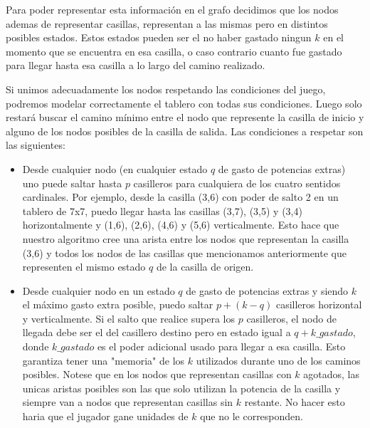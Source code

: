 Para poder representar esta informaci\'on en el grafo decidimos que los nodos ademas de representar casillas, representan a las mismas pero en distintos posibles estados. Estos estados pueden ser el no haber gastado ningun $k$ en el momento que se encuentra en esa casilla, o caso contrario cuanto fue gastado para llegar hasta esa casilla a lo largo del camino realizado.


Si unimos adecuadamente los nodos respetando las condiciones del juego, podremos modelar correctamente el tablero con todas sus condiciones. Luego solo restar\'a buscar el camino m\'inimo entre el nodo que represente la casilla de inicio y alguno de los nodos posibles de la casilla de salida. Las condiciones a respetar son las siguientes:

\begin{itemize}
\item Desde cualquier nodo (en cualquier estado $q$ de gasto de potencias extras) uno puede saltar hasta $p$ casilleros para cualquiera de los cuatro sentidos cardinales. Por ejemplo, desde la casilla (3,6) con poder de salto 2 en un tablero de 7x7, puedo llegar hasta las casillas (3,7), (3,5) y (3,4) horizontalmente y (1,6), (2,6), (4,6) y (5,6) verticalmente. Esto hace que nuestro algoritmo cree una arista entre los nodos que representan la casilla (3,6) y todos los nodos de las casillas que mencionamos anteriormente que representen el mismo estado $q$ de la casilla de origen.
\item Desde cualquier nodo en un estado $q$ de gasto de potencias extras y siendo $k$ el m\'aximo gasto extra posible, puedo saltar $p+(k-q)$ casilleros horizontal y verticalmente. Si el salto que realice supera los $p$ casilleros, el nodo de llegada debe ser el del casillero destino pero en estado igual a $q+k\_gastado$, donde $k\_gastado$ es el poder adicional usado para llegar a esa casilla. Esto garantiza tener una "memoria" de los $k$ utilizados durante uno de los caminos posibles. Notese que en los nodos que representan casillas con $k$ agotados, las unicas aristas posibles son las que solo utilizan la potencia de la casilla y siempre van a nodos que representan casillas sin $k$ restante. No hacer esto haria que el jugador gane unidades de $k$ que no le corresponden.
\end{itemize}

